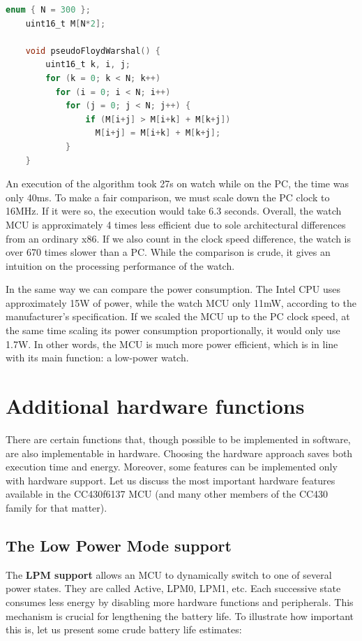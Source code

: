 \begin{lstlisting}[numbers=none, keywordstyle=\bfseries, language=C]
    enum { N = 300 };
    uint16_t M[N*2];

    void pseudoFloydWarshal() {
        uint16_t k, i, j;
        for (k = 0; k < N; k++)
          for (i = 0; i < N; i++)
            for (j = 0; j < N; j++) {
                if (M[i+j] > M[i+k] + M[k+j])
                  M[i+j] = M[i+k] + M[k+j];
            }
    }
\end{lstlisting}

An execution of the algorithm took 27s on watch while on the PC, the
time was only 40ms.  To make a fair comparison, we must scale down the
PC clock to 16MHz. If it were so, the execution would take 6.3
seconds. Overall, the watch MCU is approximately 4 times less
efficient due to sole architectural differences from an ordinary x86.
If we also count in the clock speed difference, the watch is over 670
times slower than a PC. While the comparison is crude, it gives an
intuition on the processing performance of the watch.

In the same way we can compare the power consumption.  The Intel CPU uses
approximately 15W of power, while the watch MCU only 11mW, according to
the manufacturer's \cite{CC430F6137ds} specification. If we
scaled the MCU up to the PC clock speed, at the same time scaling its
power consumption proportionally, it would only use 1.7W. In
other words, the MCU is much more power efficient, which is in line
with its main function: a low-power watch.

\section{Additional hardware functions}
\label{ch:hardware_functions}

There are certain functions that, though possible to be implemented in
software, are also implementable in hardware. Choosing the
hardware approach saves both execution time and energy. Moreover, some
features can be implemented only with hardware support. Let us discuss
the most important hardware features available in the CC430f6137 MCU
(and many other members of the CC430 family for that matter).

\subsection{The Low Power Mode support}
The {\bf LPM support} allows an MCU to dynamically switch to
one of several power states.  They are called Active, LPM0, LPM1, etc.
Each successive state consumes less energy by disabling more hardware
functions and peripherals. This mechanism is crucial for lengthening
the battery life. To illustrate how important this is, let us present
some crude battery life estimates:

